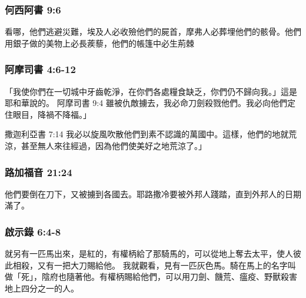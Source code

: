 \subsubsection{何西阿書 9:6}
看哪，他們逃避災難，埃及人必收殮他們的屍首，摩弗人必葬埋他們的骸骨。他們用銀子做的美物上必長蒺藜，他們的帳篷中必生荊棘

\subsubsection{阿摩司書 4:6-12}
「我使你們在一切城中牙齒乾淨，在你們各處糧食缺乏，你們仍不歸向我。」這是耶和華說的。
阿摩司書 9:4
雖被仇敵擄去，我必命刀劍殺戮他們。我必向他們定住眼目，降禍不降福。」

撒迦利亞書 7:14
我必以旋風吹散他們到素不認識的萬國中。這樣，他們的地就荒涼，甚至無人來往經過，因為他們使美好之地荒涼了。」

\subsubsection{路加福音 21:24}
他們要倒在刀下，又被擄到各國去。耶路撒冷要被外邦人踐踏，直到外邦人的日期滿了。


\subsubsection{啟示錄 6:4-8}
就另有一匹馬出來，是紅的，有權柄給了那騎馬的，可以從地上奪去太平，使人彼此相殺，又有一把大刀賜給他。
我就觀看，見有一匹灰色馬。騎在馬上的名字叫做「死」，陰府也隨著他。有權柄賜給他們，可以用刀劍、饑荒、瘟疫、野獸殺害地上四分之一的人。














